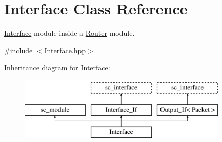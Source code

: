 \hypertarget{classInterface}{\section{Interface Class Reference}
\label{classInterface}
}


\hyperlink{classInterface}{Interface} module inside a \hyperlink{classRouter}{Router} module.  




{\ttfamily \#include $<$Interface.\-hpp$>$}

Inheritance diagram for Interface\-:\begin{figure}[H]
\begin{center}
\leavevmode
\includegraphics[height=3.000000cm]{classInterface}
\end{center}
\end{figure}
